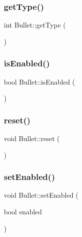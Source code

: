 \mbox{\label{class_bullet_a73634149134359bca3f2201fb6284707}} 
\subsubsection{\texorpdfstring{get\+Type()}{getType()}}
{\footnotesize\ttfamily int Bullet\+::get\+Type (\begin{DoxyParamCaption}{ }\end{DoxyParamCaption})}

\mbox{\label{class_bullet_a459d9d3adb6bdd2899965e1916eafb49}} 
\subsubsection{\texorpdfstring{is\+Enabled()}{isEnabled()}}
{\footnotesize\ttfamily bool Bullet\+::is\+Enabled (\begin{DoxyParamCaption}{ }\end{DoxyParamCaption})}

\mbox{\label{class_bullet_af2e8a6860232266f180efbdb2a68f8c9}} 
\subsubsection{\texorpdfstring{reset()}{reset()}}
{\footnotesize\ttfamily void Bullet\+::reset (\begin{DoxyParamCaption}{ }\end{DoxyParamCaption})}

\mbox{\label{class_bullet_a31f36da7eb69fdf357670f2ac7bbae85}} 
\subsubsection{\texorpdfstring{set\+Enabled()}{setEnabled()}}
{\footnotesize\ttfamily void Bullet\+::set\+Enabled (\begin{DoxyParamCaption}\item[{bool}]{enabled }\end{DoxyParamCaption})}

